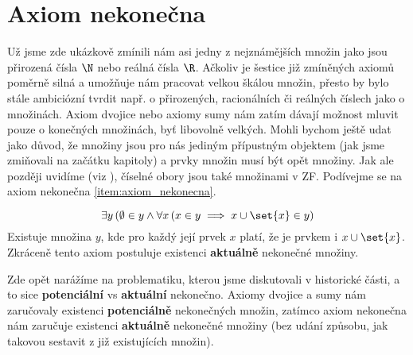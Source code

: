 \section{Axiom nekonečna}\label{sec:axiom_nekonecna}
Už jsme zde ukázkově zmínili nám asi jedny z nejznámějších množin jako jsou přirozená čísla $\N$ nebo reálná čísla $\R$. Ačkoliv je šestice již zmíněných axiomů poměrně silná a umožňuje nám pracovat velkou škálou množin, přesto by bylo stále ambiciózní tvrdit např. o přirozených, racionálních či reálných číslech jako o množinách. Axiom dvojice nebo axiomy sumy nám zatím dávají možnost mluvit pouze o konečných množinách, byť libovolně velkých. Mohli bychom ještě udat jako důvod, že množiny jsou pro nás jediným přípustným objektem (jak jsme zmiňovali na začátku kapitoly) a prvky množin musí být opět množiny. Jak ale později uvidíme (viz ), číselné obory jsou také množinami v ZF. Podívejme se na axiom nekonečna \ref{item:axiom_nekonecna}.
\medskip

\begin{equation*}
    \exists y\, (\emptyset\in y \land \forall x\,(x\in y\implies x\cup\set{x}\in y)
\end{equation*}
Existuje množina $y$, kde pro každý její prvek $x$ platí, že je prvkem i $x\cup\set{x}$. Zkráceně tento axiom postuluje existenci \textbf{aktuálně} nekonečné množiny.\par
Zde opět narážíme na problematiku, kterou jsme diskutovali v historické části, a to sice \textbf{potenciální} vs \textbf{aktuální} nekonečno. Axiomy dvojice a sumy nám zaručovaly existenci \textbf{potenciálně} nekonečných množin, zatímco axiom nekonečna nám zaručuje existenci \textbf{aktuálně} nekonečné množiny (bez udání způsobu, jak takovou sestavit z již existujících množin).\par